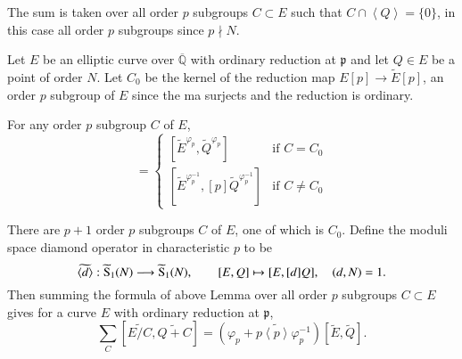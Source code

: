 The sum is taken over all order $p$ subgroups $C\subset E$ such that $C\cap \left\langle Q\right\rangle =\{0\}$,
in this case all order $p$ subgroups since $p\nmid N$.\par
Let $E$ be an elliptic curve over $\overline{\mathbb{Q}}$ with ordinary reduction at $\mathfrak{p}$ and let 
$Q\in E$ be a point of order $N$. Let $C_0$ be the kernel of the reduction map $E[p]\longrightarrow \widetilde{E}[p]$,
an order $p$ subgroup of $E$ since the ma surjects and the reduction is ordinary. 
\begin{lemma}
    For any order $p$ subgroup $C$ of $E$, 
    \begin{equation*}
        [\widetilde{E/C},\widetilde{Q+C}]=\begin{cases}
            [\widetilde{E}^{\varphi_p},\widetilde{Q}^{\varphi_p}] & \text{if } C=C_0\\
            [\widetilde{E}^{\varphi_p^{-1}},[p]\widetilde{Q}^{\varphi_p^{-1}}] & \text{if } C\neq C_0
        \end{cases}
    \end{equation*}
    \label{lm}
\end{lemma}
There are $p+1$ order $p$ subgroups $C$ of $E$, one of which is $C_0$. Define the moduli space diamond 
operator in characteristic $p$ to be 
\begin{equation*}
    \widetilde{\left\langle d\right\rangle }:\widetilde{{\rm S}}_1(N) \longrightarrow \widetilde{{\rm S}}_1(N), \qquad [E,Q]\mapsto [E,[d]Q], \quad (d,N)=1.
\end{equation*}
Then summing the formula of above Lemma over all order $p$ subgroups $C\subset E$ gives for a curve $E$ with ordinary
reduction at $\mathfrak{p}$, 
\begin{equation}
    \sum_C [\widetilde{E/C}, \widetilde{Q+C}]=(\varphi_p+p\widetilde{\left\langle p\right\rangle }\varphi_p^{-1})[\widetilde{E},\widetilde{Q}].
    \label{eq:reduced_T_p}
\end{equation}

